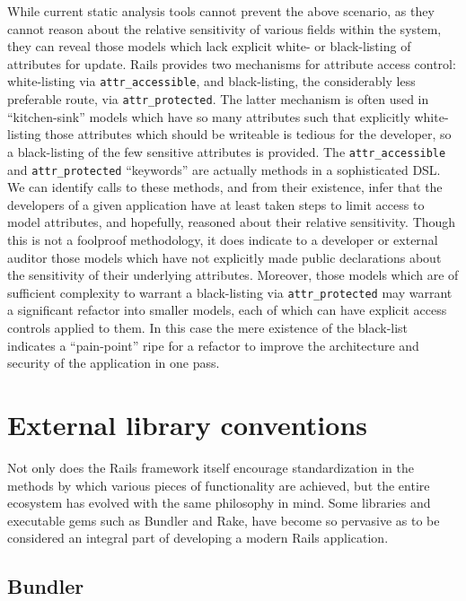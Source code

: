 \documentclass[conference]{IEEEtran}
\begin{document}
While current static analysis tools cannot prevent the above scenario, as they
cannot reason about the relative sensitivity of various fields within the system,
they can reveal those models which lack explicit white- or black-listing of attributes for
update.  Rails provides two mechanisms for attribute access control: white-listing via
\texttt{attr\_accessible}, and black-listing, the considerably less preferable route, via
\texttt{attr\_protected}.  The latter mechanism is often used in ``kitchen-sink'' models
which have so many attributes such that explicitly white-listing those attributes which should
be writeable is tedious for the developer, so a black-listing of the few sensitive
attributes is provided.  The \texttt{attr\_accessible} and \texttt{attr\_protected}
``keywords'' are actually methods in a sophisticated DSL.  We can identify calls to these
methods, and from their existence, infer that the developers of a given application have
at least taken steps to limit access to model attributes, and hopefully, reasoned about
their relative sensitivity. Though this is not a foolproof methodology,  it does indicate
to a developer or external auditor those models which have not explicitly made public
declarations about the sensitivity of their underlying attributes.
Moreover, those models which are of sufficient complexity to warrant a black-listing via
\texttt{attr\_protected} may warrant a significant refactor into smaller models, each of
which can have explicit access controls applied to them.  In this case the mere existence
of the black-list indicates a ``pain-point'' ripe for a refactor to improve the
architecture and security of the application in one pass.

\section{External library conventions}

Not only does the Rails framework itself encourage standardization in the
methods by which various pieces of functionality are achieved, but the entire
ecosystem has evolved with the same philosophy in mind.  Some libraries and
executable gems such as Bundler and Rake, have become so pervasive as to be considered an
integral part of developing a modern Rails application.

\subsection{Bundler}
\end{document}
